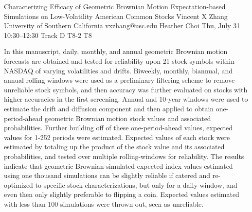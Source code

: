 \begin{talk}
  {Characterizing Efficacy of Geometric Brownian Motion Expectation-based Simulations on Low-Volatility American Common Stocks}%
  {Vincent X Zhang}%
  {University of Southern California}%
  {vxzhang@usc.edu}%
  {Heather Choi}%
  {}%
  {Thu, July 31 10:30–12:30 Track D}%
  {T8-2}%
  {T8}%
			
In this manuscript, daily, monthly, and annual geometric Brownian motion forecasts are obtained and tested for reliability upon 21 stock symbols within NASDAQ of varying volatilities and drifts. Biweekly, monthly, biannual, and annual rolling windows were used as a preliminary filtering scheme to remove unreliable stock symbols, and then accuracy was further evaluated on stocks with higher accuracies in the first screening. Annual and 10-year windows were used to estimate the drift and diffusion component and then applied to obtain one-period-ahead geometric Brownian motion stock values and associated probabilities. Further building off of these one-period-ahead values, expected values for 1-252 periods were estimated. Expected values of each stock were estimated by totaling up the product of the stock value and its associated probabilities, and tested over multiple rolling-windows for reliability. The results indicate that geometric Brownian-simulated expected index values estimated using one thousand simulations can be slightly reliable if catered and re-optimized to specific stock characterizations, but only for a daily window, and even then only slightly preferable to flipping a coin. Expected values estimated with less than 100 simulations were thrown out, seen as unreliable.


\medskip


\end{talk}
